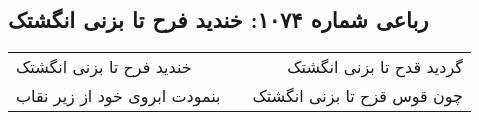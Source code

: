 \begin{center}
\section*{رباعی شماره ۱۰۷۴: خندید فرح تا بزنی انگشتک}
\label{sec:1074}
\begin{longtable}{l p{0.5cm} r}
خندید فرح تا بزنی انگشتک
&&
گردید قدح تا بزنی انگشتک
\\
بنمودت ابروی خود از زیر نقاب
&&
چون قوس قزح تا بزنی انگشتک
\\
\end{longtable}
\end{center}
